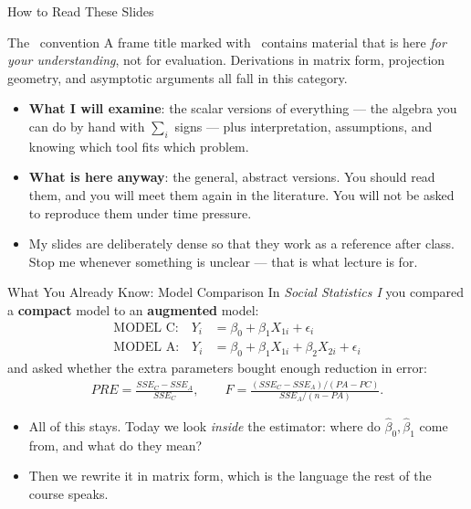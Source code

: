 \documentclass[aspectratio=169,11pt,xcolor=dvipsnames]{beamer}
\newcommand{\adv}{\,\raisebox{0.6pt}{\textcolor{accent}{$\bigstar$}}}
\begin{document}
\begin{frame}{How to Read These Slides}
\begin{alertblock}{The \adv{} convention}
A frame title marked with \adv{} contains material that is here \emph{for your
understanding}, not for evaluation. Derivations in matrix form, projection
geometry, and asymptotic arguments all fall in this category.
\end{alertblock}
\vskip4pt
\begin{itemize}\itemsep4pt
  \item \textbf{What I will examine}: the \alert{scalar} versions of everything ---
        the algebra you can do by hand with $\sum_i$ signs --- plus interpretation,
        assumptions, and knowing which tool fits which problem.
  \item \textbf{What is here anyway}: the general, abstract versions. You should
        read them, and you will meet them again in the literature. You will not be
        asked to reproduce them under time pressure.
  \item My slides are deliberately dense so that they work as a reference after
        class. Stop me whenever something is unclear --- that is what lecture is for.
\end{itemize}
\end{frame}

\begin{frame}{What You Already Know: Model Comparison}
In \textit{Social Statistics I} you compared a \textbf{compact} model to an
\textbf{augmented} model:
\begin{align*}
  \text{MODEL C:}\quad Y_i &= \beta_0 + \beta_1 X_{1i} + \epsilon_i \\
  \text{MODEL A:}\quad Y_i &= \beta_0 + \beta_1 X_{1i} + \beta_2 X_{2i} + \epsilon_i
\end{align*}
and asked whether the extra parameters bought enough reduction in error:
\begin{align*}
  PRE = \frac{SSE_C - SSE_A}{SSE_C},
  \qquad
  F = \frac{(SSE_C - SSE_A)/(PA - PC)}{SSE_A/(n - PA)}.
\end{align*}
\pause
\begin{itemize}
  \item All of this stays. Today we look \emph{inside} the estimator: where do
        $\hat\beta_0,\hat\beta_1$ come from, and what do they mean?
  \item Then we rewrite it in matrix form, which is the language the rest of the
        course speaks.
\end{itemize}
\end{frame}
\end{document}
